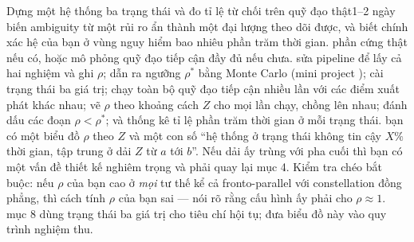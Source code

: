 \documentclass[../../marker.tex]{subfiles}
\begin{document}
\begin{ungdung}
\end{ungdung}

\begin{duan}{Dựng một hệ thống ba trạng thái và đo tỉ lệ từ chối trên quỹ đạo thật}{1--2 ngày}
\dmt biến ambiguity từ một rủi ro ẩn thành một đại lượng theo dõi được, và biết chính xác hệ của bạn ở vùng nguy hiểm bao nhiêu phần trăm thời gian.
\ddl phần cứng thật nếu có, hoặc mô phỏng quỹ đạo tiếp cận đầy đủ nếu chưa.
\dbc sửa pipeline để lấy cả hai nghiệm và ghi \(\rho\); dẫn ra ngưỡng \(\rho^*\) bằng Monte Carlo (mini project ); cài trạng thái ba giá trị; chạy toàn bộ quỹ đạo tiếp cận nhiều lần với các điểm xuất phát khác nhau; vẽ \(\rho\) theo khoảng cách \(Z\) cho mọi lần chạy, chồng lên nhau; đánh dấu các đoạn \(\rho < \rho^*\); và thống kê tỉ lệ phần trăm thời gian ở mỗi trạng thái.
\dxk bạn có một biểu đồ \(\rho\) theo \(Z\) và một con số ``hệ thống ở trạng thái không tin cậy \(X\%\) thời gian, tập trung ở dải \(Z\) từ \(a\) tới \(b\)''. Nếu dải ấy trùng với pha cuối thì bạn có một vấn đề thiết kế nghiêm trọng và phải quay lại  mục 4. Kiểm tra chéo bắt buộc: nếu \(\rho\) của bạn cao ở \emph{mọi} tư thế kể cả fronto-parallel với constellation đồng phẳng, thì cách tính \(\rho\) của bạn sai ---  nói rõ rằng cấu hình ấy phải cho \(\rho \approx 1\).
\dnv {} mục 8 dùng trạng thái ba giá trị cho tiêu chí hội tụ;  đưa biểu đồ này vào quy trình nghiệm thu.
\end{duan}
\end{document}
